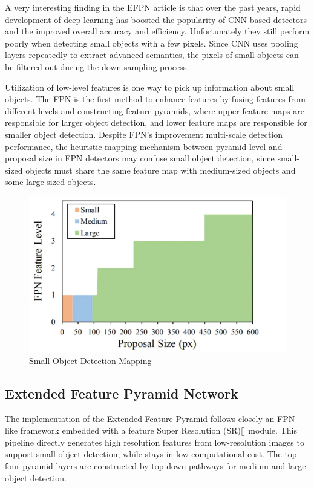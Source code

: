 A very interesting finding in the EFPN article is that over the past years, rapid development of deep learning has boosted the popularity of 
CNN-based detectors and the improved overall accuracy and efficiency. Unfortunately they still perform poorly when detecting small objects with a few pixels. 
Since CNN uses pooling layers repeatedly to extract advanced semantics, the pixels of small objects can be filtered out during the down-sampling process.

\newpage
Utilization of low-level features is one way to pick up information about small objects. The FPN is the first method to enhance features 
by fusing features from different levels and constructing feature pyramids, where upper feature maps are responsible for larger object detection, and lower 
feature maps are responsible for smaller object detection. Despite FPN's improvement multi-scale detection performance, the heuristic mapping mechanism 
between pyramid level and proposal size in FPN detectors may confuse small object detection, since small-sized objects must share the same feature map with 
medium-sized objects and some large-sized objects.

\begin{figure}[h!]
    \centering
    \includegraphics[scale=0.55]{Figures/efpn-sod-mapping.jpg}
    \caption{Small Object Detection Mapping}
    \label{fig:efpn-sod-mapping}
\end{figure}


\newpage
\subsection{Extended Feature Pyramid Network}

The implementation of the Extended Feature Pyramid follows closely an FPN-like framework embedded with a feature Super Resolution (SR)[] module. 
This pipeline directly generates high resolution features from low-resolution images to support small object detection, while stays in low computational 
cost. The top four pyramid layers are constructed by top-down pathways for medium and large object detection. 

